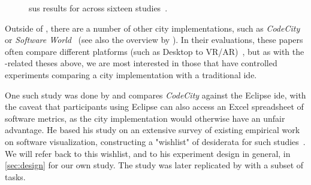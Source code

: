\documentclass[../thesis]{subfiles}
\begin{document}
\begin{figure}
	\begin{center}
	\end{center}
	\caption{\Gls{sus} results for \SEE{} across sixteen studies~\cite{davidwagner2020, felixgaebler2021, galperin2021, hannesmasuch2020, kevindoehl2020, lennartkipka2020, maximilianwick2022, michelkrause2024, moritz, nicoweiser2021, robertbohnsack2020, rohlfing2024, rubensmidt2021, schramm2022, sulanabubakarov2021, yannisrohloff2021}.}\label{fig:seesus}
\end{figure}

Outside of \SEE{}, there are a number of other \gls{city} implementations, such as \emph{CodeCity}~\cite{wettel2007} or \emph{Software World}~\cite{knight2000} (see also the overview by \textcite{jeffery2019}).
In their evaluations, these papers often compare different platforms (such as Desktop to VR/AR)~\cite[\eg,][]{merino2017,fittkau2015, merino2018}, but as with the \SEE{}-related theses above, we are most interested in those that have controlled experiments comparing a \gls{city} implementation with a traditional \gls{ide}.

One such study was done by \textcite{wettel2011} and compares \emph{CodeCity} against the Eclipse \gls{ide}, with the caveat that participants using Eclipse can also access an Excel spreadsheet of software metrics, as the \gls{city} implementation would otherwise have an unfair advantage.
He based his study on an extensive survey of existing empirical work on software visualization, constructing a "wishlist" of desiderata for such studies~\cite[chapter 7]{wettel2011}.
We will refer back to this wishlist, and to his experiment design in general, in \cref{sec:design} for our own study.
The study was later replicated by \textcite{romano2019} with a subset of tasks.
\end{document}
